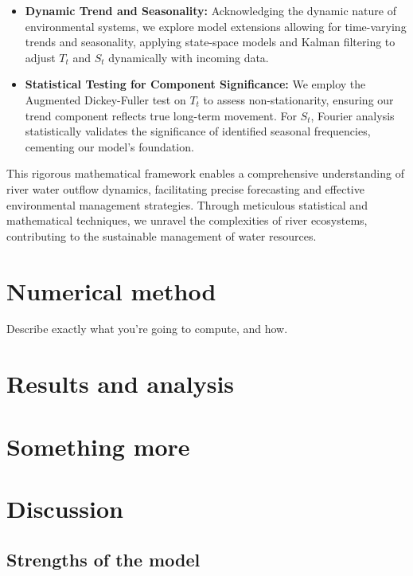\documentclass[pre,12pt]{revtex4-1}
\begin{document}
\begin{itemize}
    \item \textbf{Dynamic Trend and Seasonality:} Acknowledging the dynamic nature of environmental systems, we explore model extensions allowing for time-varying trends and seasonality, applying state-space models and Kalman filtering to adjust \(T_t\) and \(S_t\) dynamically with incoming data.
    
    \item \textbf{Statistical Testing for Component Significance:} We employ the Augmented Dickey-Fuller test on \(T_t\) to assess non-stationarity, ensuring our trend component reflects true long-term movement. For \(S_t\), Fourier analysis statistically validates the significance of identified seasonal frequencies, cementing our model's foundation.
\end{itemize}

This rigorous mathematical framework enables a comprehensive understanding of river water outflow dynamics, facilitating precise forecasting and effective environmental management strategies. Through meticulous statistical and mathematical techniques, we unravel the complexities of river ecosystems, contributing to the sustainable management of water resources.


\section{Numerical method}\label{Numerics}

Describe exactly what you're going to compute, and how.

\section{Results and analysis}\label{Results}



\section{Something more}\label{Something}


\section{Discussion}\label{Discussion}

\subsection{Strengths of the model}
\end{document}
